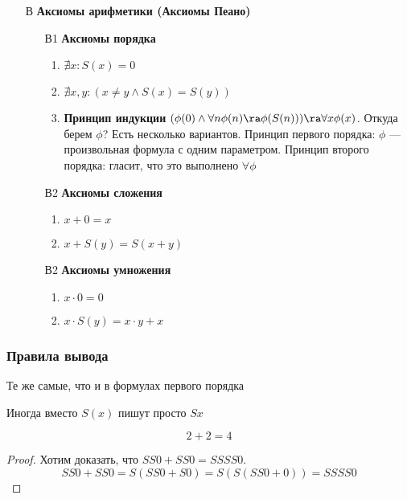 \begin{enumerate}
\begin{enumerate}
    \end{enumerate}
    \item[В] \textbf{Аксиомы арифметики (Аксиомы Пеано)}
    \begin{enumerate}
        \item[В1] \textbf{Аксиомы порядка}
        \begin{enumerate}
            \item \(\nexists x: S(x) = 0\)
            \item \(\nexists x, y: (x \ne y \wedge S(x) = S(y))\)
            \item \textbf{Принцип индукции} \((\phi(0) \wedge \forall n \phi(n) \ra \phi(S(n))) \ra \forall x \phi(x)\).
            Откуда берем \(\phi\)? Есть несколько вариантов. Принцип первого порядка: \(\phi\) --- произвольная формула с одним параметром. Принцип второго порядка: гласит, что это выполнено \(\forall \phi\)
        \end{enumerate}
        \item[В2] \textbf{Аксиомы сложения}
        \begin{enumerate}
            \item \(x + 0 = x\)
            \item \(x + S(y) = S(x + y)\)
        \end{enumerate}
        \item[В2] \textbf{Аксиомы умножения}
        \begin{enumerate}
            \item \(x \cdot 0 = 0 \)
            \item \(x \cdot S(y) = x\cdot y + x\)
        \end{enumerate}
    \end{enumerate}
\end{enumerate}

\subsubsection{Правила вывода}
Те же самые, что и в формулах первого порядка

Иногда вместо \(S(x)\) пишут просто \(Sx\)

\begin{proposition}
    \[2 + 2 = 4\]
\end{proposition}
\begin{proof}
    Хотим доказать, что \(SS0 + SS0 = SSSS0\).
    \[SS0 + SS0 = S(SS0 + S0) = S(S(SS0 + 0)) = SSSS0\]
\end{proof}

